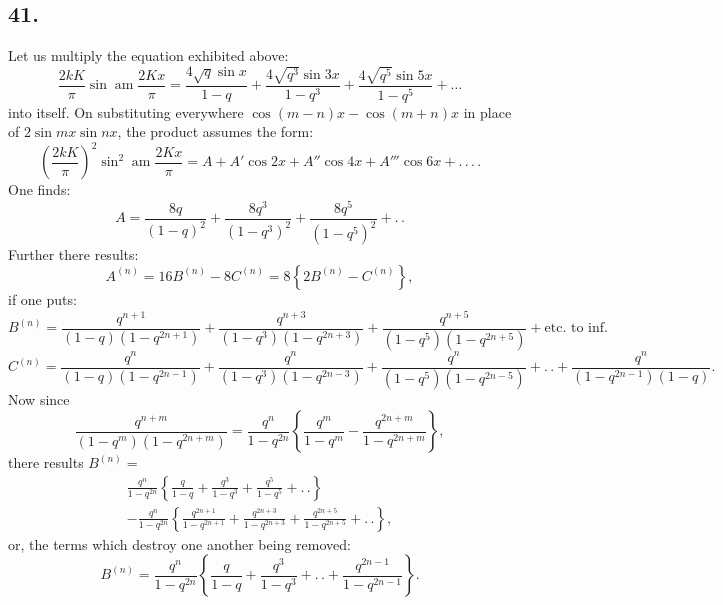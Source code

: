 \documentclass{article}
\begin{document}
\subsection*{41.}

Let us multiply the equation exhibited above:
\[
\frac{2kK}{\pi}\sin\operatorname{am}\frac{2Kx}{\pi}=\frac{4\sqrt{q}\sin x}{1-q}+\frac{4\sqrt{q^{3}}\sin 3x}{1-q^{3}}+\frac{4\sqrt{q^{5}}\sin 5x}{1-q^{5}}+\ldots
\]
into itself. On substituting everywhere $\cos(m-n)x-\cos(m+n)x$ in place of $2\sin mx\sin nx$, the product assumes the form:
\[
\left(\frac{2kK}{\pi}\right)^{2}\sin^{2}\operatorname{am}\frac{2Kx}{\pi}=A+A'\cos 2x+A''\cos 4x+A'''\cos 6x+.\,.\,.\,.
\]
One finds:
\[
A=\frac{8q}{(1-q)^{2}}+\frac{8q^{3}}{(1-q^{3})^{2}}+\frac{8q^{5}}{(1-q^{5})^{2}}+.\,.
\]
Further there results:
\[
A^{(n)}=16B^{(n)}-8C^{(n)}=8\left\{2B^{(n)}-C^{(n)}\right\},
\]
if one puts:
\[
B^{(n)}=\frac{q^{n+1}}{(1-q)(1-q^{2n+1})}+\frac{q^{n+3}}{(1-q^{3})(1-q^{2n+3})}+\frac{q^{n+5}}{(1-q^{5})(1-q^{2n+5})}+\text{etc.\ to inf.}
\]
\[
C^{(n)}=\frac{q^{n}}{(1-q)(1-q^{2n-1})}+\frac{q^{n}}{(1-q^{3})(1-q^{2n-3})}+\frac{q^{n}}{(1-q^{5})(1-q^{2n-5})}+.\,.+\frac{q^{n}}{(1-q^{2n-1})(1-q)}.
\]
Now since
\[
\frac{q^{n+m}}{(1-q^{m})(1-q^{2n+m})}=\frac{q^{n}}{1-q^{2n}}\left\{\frac{q^{m}}{1-q^{m}}-\frac{q^{2n+m}}{1-q^{2n+m}}\right\},
\]
there results $B^{(n)}=$
\[
\begin{gathered}
\frac{q^{n}}{1-q^{2n}}\left\{\frac{q}{1-q}+\frac{q^{3}}{1-q^{3}}+\frac{q^{5}}{1-q^{5}}+.\,.\right\}\\[1.5ex]
-\frac{q^{n}}{1-q^{2n}}\left\{\frac{q^{2n+1}}{1-q^{2n+1}}+\frac{q^{2n+3}}{1-q^{2n+3}}+\frac{q^{2n+5}}{1-q^{2n+5}}+.\,.\right\},
\end{gathered}
\]
or, the terms which destroy one another being removed:
\[
B^{(n)}=\frac{q^{n}}{1-q^{2n}}\left\{\frac{q}{1-q}+\frac{q^{3}}{1-q^{3}}+.\,.+\frac{q^{2n-1}}{1-q^{2n-1}}\right\}.
\]
\end{document}
